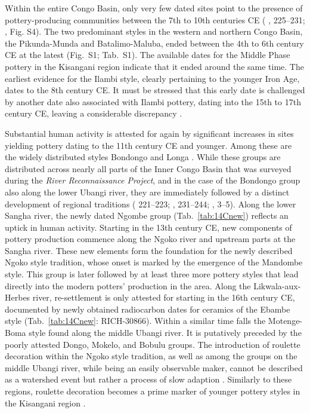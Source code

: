 \documentclass[smallextended,natbib]{svjour3}       %
\begin{document}
Within the entire Congo Basin, only very few dated sites point to the presence of pottery-producing communities between the 7th to 10th centuries CE (\citeauthor{Seidensticker.2021e} \citeyear{Seidensticker.2021e}, 225--231; \citeauthor{Seidensticker.2021} \citeyear{Seidensticker.2021}, Fig. S4). The two predominant styles in the western and northern Congo Basin, the Pikunda-Munda and Batalimo-Maluba, ended between the 4th to 6th century CE at the latest (Fig.~S1; Tab.~S1). The available dates for the Middle Phase pottery in the Kisangani region indicate that it ended around the same time. The earliest evidence for the Ilambi style, clearly pertaining to the younger Iron Age, dates to the 8th century CE. It must be stressed that this early date is challenged by another date also associated with Ilambi pottery, dating into the 15th to 17th century CE, leaving a considerable discrepancy \citep[98 Tab.~1]{LivingstoneSmith.2017}.

Substantial human activity is attested for again by significant increases in sites yielding pottery dating to the 11th century CE and younger. Among these are the widely distributed styles Bondongo and Longa \citep[Fig.~\ref{fig:chrono}; S1; Tab.~S1;][121--139]{Wotzka.1995}. While these groups are distributed across nearly all parts of the Inner Congo Basin that was surveyed during the \textit{River Reconnaissance Project}, and in the case of the Bondongo group also along the lower Ubangi river, they are immediately followed by a distinct development of regional traditions (\citeauthor{Wotzka.1995} \citeyear{Wotzka.1995} 221--223; \citeauthor{Seidensticker.2021e} \citeyear{Seidensticker.2021e}, 231--244; \citeauthor{Seidensticker.2021} \citeyear{Seidensticker.2021}, 3--5). Along the lower Sangha river, the newly dated Ngombe group (Tab.~\ref{tab:14Cnew}) reflects an uptick in human activity. Starting in the 13th century CE, new components of pottery production commence along the Ngoko river and upstream parts at the Sangha river. These new elements form the foundation for the newly described Ngoko style tradition, whose onset is marked by the emergence of the Mandombe style. This group is later followed by at least three more pottery styles that lead directly into the modern potters’ production in the area. Along the Likwala-aux-Herbes river, re-settlement is only attested for starting in the 16th century CE, documented by newly obtained radiocarbon dates for ceramics of the Ebambe style (Tab.~\ref{tab:14Cnew}: RICH-30866). Within a similar time falls the Motenge-Boma style found along the middle Ubangi river. It is putatively preceded by the poorly attested Dongo, Mokelo, and Bobulu groups. The introduction of roulette decoration within the Ngoko style tradition, as well as among the groups on the middle Ubangi river, while being an easily observable maker, cannot be described as a watershed event but rather a process of slow adaption \citep[120--123]{Seidensticker.2016b}. Similarly to these regions, roulette decoration becomes a prime marker of younger pottery styles in the Kisangani region \citep{LivingstoneSmith.2017}. 
\end{document}
